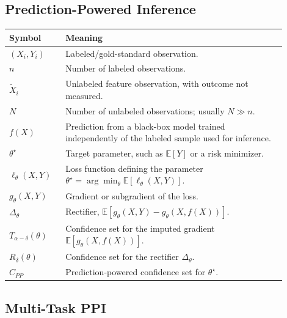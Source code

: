\documentclass[11pt]{article}
\newcommand{\E}{\mathbb{E}}
\begin{document}
\subsection*{Prediction-Powered Inference}

\begin{center}
\begin{tabular}{>{\raggedright\arraybackslash}p{0.18\linewidth}p{0.72\linewidth}}
\toprule
Symbol & Meaning \\
\midrule
$(X_i,Y_i)$ & Labeled/gold-standard observation. \\
$n$ & Number of labeled observations. \\
$\widetilde X_i$ & Unlabeled feature observation, with outcome not measured. \\
$N$ & Number of unlabeled observations; usually $N\gg n$. \\
$f(X)$ & Prediction from a black-box model trained independently of the labeled sample used for inference. \\
$\theta^\star$ & Target parameter, such as $\E[Y]$ or a risk minimizer. \\
$\ell_\theta(X,Y)$ & Loss function defining the parameter $\theta^\star=\arg\min_\theta \E[\ell_\theta(X,Y)]$. \\
$g_\theta(X,Y)$ & Gradient or subgradient of the loss. \\
$\Delta_\theta$ & Rectifier, $\E[g_\theta(X,Y)-g_\theta(X,f(X))]$. \\
$T_{\alpha-\delta}(\theta)$ & Confidence set for the imputed gradient $\E[g_\theta(X,f(X))]$. \\
$R_\delta(\theta)$ & Confidence set for the rectifier $\Delta_\theta$. \\
$C_{PP}$ & Prediction-powered confidence set for $\theta^\star$. \\
\bottomrule
\end{tabular}
\end{center}

\subsection*{Multi-Task PPI}
\end{document}
